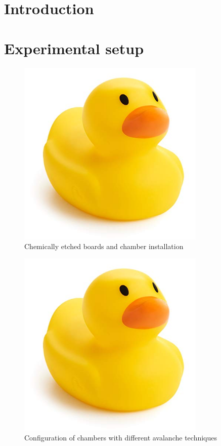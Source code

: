 \documentclass{article}
\begin{document}
\section{Introduction}

\section{Experimental setup}
\begin{figure}
  \includegraphics[width=0.8\textwidth]{fig/temp.jpg}
  \caption{Chemically etched boards and chamber installation}
\end{figure}
\begin{figure}
  \includegraphics[width=0.8\textwidth]{fig/temp.jpg}
  \caption{Configuration of chambers with different avalanche techniques}
\end{figure}
\end{document}
